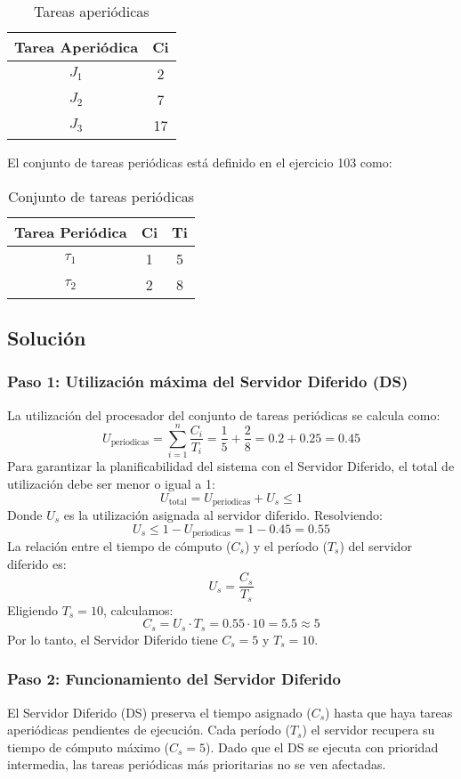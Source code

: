 \documentclass[a4paper,12pt]{article}
\begin{document}
\begin{table}[H]
\centering
\begin{tabular}{|c|c|}
\hline
\textbf{Tarea Aperiódica} & \textbf{Ci} \\ \hline
$J_1$ & 2 \\ \hline
$J_2$ & 7 \\ \hline
$J_3$ & 17 \\ \hline
\end{tabular}
\caption{Tareas aperiódicas}
\end{table}

El conjunto de tareas periódicas está definido en el ejercicio 103 como:
\begin{table}[H]
\centering
\begin{tabular}{|c|c|c|}
\hline
\textbf{Tarea Periódica} & \textbf{Ci} & \textbf{Ti} \\ \hline
$\tau_1$ & 1 & 5 \\ \hline
$\tau_2$ & 2 & 8 \\ \hline
\end{tabular}
\caption{Conjunto de tareas periódicas}
\end{table}

\subsection{Solución}
\subsubsection{Paso 1: Utilización máxima del Servidor Diferido (DS)}
La utilización del procesador del conjunto de tareas periódicas se calcula como:
\[
U_{\text{periodicas}} = \sum_{i=1}^{n} \frac{C_i}{T_i} = \frac{1}{5} + \frac{2}{8} = 0.2 + 0.25 = 0.45
\]
Para garantizar la planificabilidad del sistema con el Servidor Diferido, el total de utilización debe ser menor o igual a 1:
\[
U_{\text{total}} = U_{\text{periodicas}} + U_s \leq 1
\]
Donde \(U_s\) es la utilización asignada al servidor diferido. Resolviendo:
\[
U_s \leq 1 - U_{\text{periodicas}} = 1 - 0.45 = 0.55
\]
La relación entre el tiempo de cómputo (\(C_s\)) y el período (\(T_s\)) del servidor diferido es:
\[
U_s = \frac{C_s}{T_s}
\]
Eligiendo \(T_s = 10\), calculamos:
\[
C_s = U_s \cdot T_s = 0.55 \cdot 10 = 5.5 \approx 5
\]
Por lo tanto, el Servidor Diferido tiene \(C_s = 5\) y \(T_s = 10\).

\subsubsection{Paso 2: Funcionamiento del Servidor Diferido}
El Servidor Diferido (DS) preserva el tiempo asignado (\(C_s\)) hasta que haya tareas aperiódicas pendientes de ejecución. Cada período (\(T_s\)) el servidor recupera su tiempo de cómputo máximo (\(C_s = 5\)).  
Dado que el DS se ejecuta con prioridad intermedia, las tareas periódicas más prioritarias no se ven afectadas.
\end{document}
